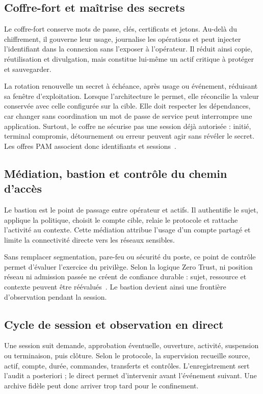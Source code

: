 \documentclass[11pt,a4paper,oneside]{report}
\theoremstyle{definition}
\theoremstyle{plain}
\begin{document}
\subsection{Coffre-fort et maîtrise des secrets}

Le coffre-fort conserve mots de passe, clés, certificats et jetons. Au-delà du chiffrement, il gouverne leur usage, journalise les opérations et peut injecter l'identifiant dans la connexion sans l'exposer à l'opérateur. Il réduit ainsi copie, réutilisation et divulgation, mais constitue lui-même un actif critique à protéger et sauvegarder.

La rotation renouvelle un secret à échéance, après usage ou événement, réduisant sa fenêtre d'exploitation. Lorsque l'architecture le permet, elle réconcilie la valeur conservée avec celle configurée sur la cible. Elle doit respecter les dépendances, car changer sans coordination un mot de passe de service peut interrompre une application. Surtout, le coffre ne sécurise pas une session déjà autorisée : initié, terminal compromis, détournement ou erreur peuvent agir sans révéler le secret. Les offres PAM associent donc identifiants et sessions~\cite{ref16,ref17,ref18}.

\subsection{Médiation, bastion et contrôle du chemin d'accès}

Le bastion est le point de passage entre opérateur et actifs. Il authentifie le sujet, applique la politique, choisit le compte cible, relaie le protocole et rattache l'activité au contexte. Cette médiation attribue l'usage d'un compte partagé et limite la connectivité directe vers les réseaux sensibles.

Sans remplacer segmentation, pare-feu ou sécurité du poste, ce point de contrôle permet d'évaluer l'exercice du privilège. Selon la logique Zero Trust, ni position réseau ni admission passée ne créent de confiance durable : sujet, ressource et contexte peuvent être réévalués~\cite{ref22,ref47}. Le bastion devient ainsi une frontière d'observation pendant la session.

\subsection{Cycle de session et observation en direct}

Une session suit demande, approbation éventuelle, ouverture, activité, suspension ou terminaison, puis clôture. Selon le protocole, la supervision recueille source, actif, compte, durée, commandes, transferts et contrôles. L'enregistrement sert l'audit a posteriori ; le direct permet d'intervenir avant l'événement suivant. Une archive fidèle peut donc arriver trop tard pour le confinement.
\end{document}
